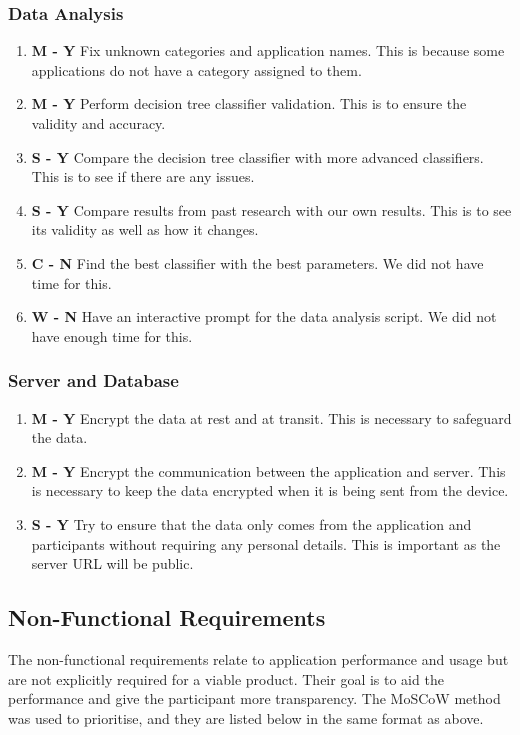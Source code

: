 \documentclass{l4proj}
\begin{document}
\subsubsection{Data Analysis}
\begin{enumerate}[resume,label={\textbf{\arabic* -}}]
    \item \textbf{M - Y} Fix unknown categories and application names. This is because some applications do not have a category assigned to them.
    \item \textbf{M - Y} Perform decision tree classifier validation. This is to ensure the validity and accuracy.
    \item \textbf{S - Y} Compare the decision tree classifier with more advanced classifiers. This is to see if there are any issues.
    \item \textbf{S - Y} Compare results from past research with our own results. This is to see its validity as well as how it changes.
    \item \textbf{C - N} Find the best classifier with the best parameters. We did not have time for this.
    \item \textbf{W - N} Have an interactive prompt for the data analysis script. We did not have enough time for this.
\end{enumerate}

\subsubsection{Server and Database}
\begin{enumerate}[resume,label={\textbf{\arabic* -}}]
    \item \textbf{M - Y} Encrypt the data at rest and at transit. This is necessary to safeguard the data.
    \item \textbf{M - Y} Encrypt the communication between the application and server. This is necessary to keep the data encrypted when it is being sent from the device.
    \item \textbf{S - Y} Try to ensure that the data only comes from the application and participants without requiring any personal details. This is important as the server URL will be public.
\end{enumerate}

\subsection{Non-Functional Requirements}
The non-functional requirements relate to application performance and usage but are not explicitly required for a viable product. Their goal is to aid the performance and give the participant more transparency. The MoSCoW method was used to prioritise, and they are listed below in the same format as above.
\end{document}

